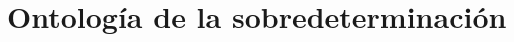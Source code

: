 \chapter[\textbf{Andrés Daín}\\ Ontología de la sobredeterminación]{Ontología de la sobredeterminación} %

\begin{center}
	 \\[1ex]
	\makebox[2pc]{\dotfill}
\end{center}

